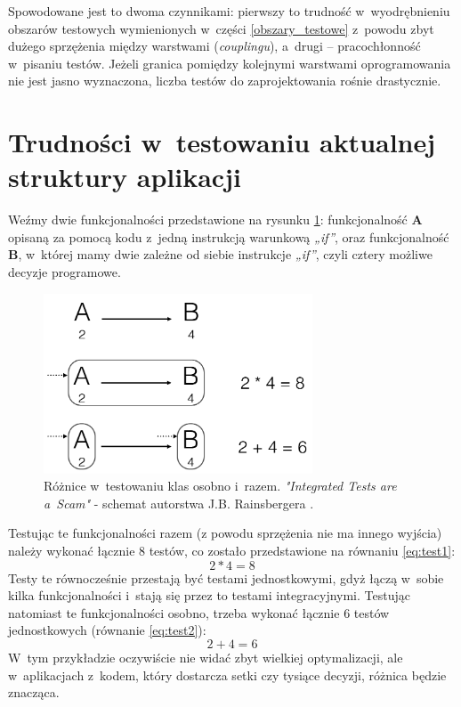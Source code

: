 Spowodowane jest to dwoma czynnikami: pierwszy to trudność w~wyodrębnieniu obszarów testowych wymienionych w~części \ref{obszary_testowe} z~powodu zbyt dużego sprzężenia między warstwami (\textit{couplingu}), a~drugi – pracochłonność w~pisaniu testów. Jeżeli granica pomiędzy kolejnymi warstwami oprogramowania nie jest jasno wyznaczona, liczba testów do zaprojektowania rośnie drastycznie.

\section{Trudności w~testowaniu aktualnej struktury \newline aplikacji}
\label{testowanie_starej_struktury}

Weźmy dwie funkcjonalności przedstawione na rysunku \ref{fig:testowanie_klas}: funkcjonalność \textbf{A} opisaną za pomocą kodu z~jedną instrukcją warunkową \textit{„if”}, oraz funkcjonalność \textbf{B}, w~której mamy dwie zależne od siebie instrukcje \textit{„if”}, czyli cztery możliwe decyzje programowe. 

\begin{figure}[!htb]
    \centering
    \includegraphics[width=8cm]{imgs/ch3_przyklad_testowania_klas_pl.png}
    \caption
{Różnice w~testowaniu klas osobno i~razem. \textit{"Integrated Tests are a~Scam"} - schemat autorstwa J.B. Rainsbergera  \cite{website:android:testowanieklas}.}
    \label{fig:testowanie_klas}
\end{figure} 

Testując te funkcjonalności razem (z powodu sprzężenia nie ma innego wyjścia) należy wykonać łącznie 8 testów, co zostało przedstawione na równaniu \ref{eq:test1}:
\begin{equation}
2*4=8 \label{eq:test1}
\end{equation}
Testy te równocześnie przestają być testami jednostkowymi, gdyż łączą w~sobie kilka funkcjonalności i~stają się przez to testami integracyjnymi. Testując natomiast te funkcjonalności osobno, trzeba wykonać łącznie 6 testów jednostkowych (równanie \ref{eq:test2}):
\begin{equation}
2+4=6 \label{eq:test2}
\end{equation}
W~tym przykładzie oczywiście nie widać zbyt wielkiej optymalizacji, ale w~aplikacjach z~kodem, który dostarcza setki czy tysiące decyzji, różnica będzie znacząca.

